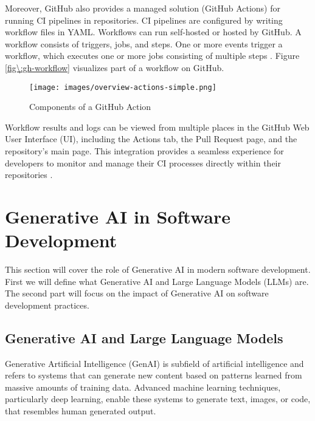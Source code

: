 Moreover, GitHub also provides a managed solution (GitHub Actions) for running CI pipelines in repositories. CI pipelines are configured by writing workflow files in YAML. Workflows can run self-hosted or hosted by GitHub. A workflow consists of triggers, jobs, and steps. One or more events trigger a workflow, which executes one or more jobs consisting of multiple steps \cite{UnderstandingGitHubActions}. Figure \ref{fig\:gh-workflow} visualizes part of a workflow on GitHub.

\begin{figure}[H]
    \centering
    \texttt{[image: images/overview-actions-simple.png]}
    \caption{Components of a GitHub Action}
    \label{fig:gh-workflow}
\end{figure}

Workflow results and logs can be viewed from multiple places in the GitHub Web User Interface (UI), including the Actions tab, the Pull Request page, and the repository's main page. This integration provides a seamless experience for developers to monitor and manage their CI processes directly within their repositories \cite{GitHubActions2025}.


\section{Generative AI in Software Development}

This section will cover the role of Generative AI in modern software development. First we will define what Generative AI and Large Language Models (LLMs) are. The second part will focus on the impact of Generative AI on software development practices.

\subsection{Generative AI and Large Language Models}
Generative Artificial Intelligence (GenAI) is subfield of artificial intelligence and refers to systems that can generate new content based on patterns learned from massive amounts of training data. Advanced machine learning techniques, particularly deep learning, enable these systems to generate text, images, or code, that resembles human generated output. \cite{WhatGenerativeAI2021}

